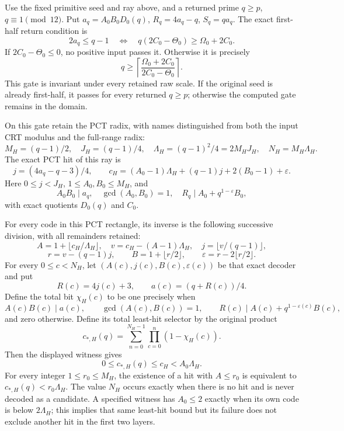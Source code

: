 \begin{theorem}
\label{thm:raw-first-half-code}
Use the fixed primitive seed and ray above, and a returned prime
\(q\ge p\), \(q\equiv1\pmod{12}\).
Put \(a_q=A_0B_0D_0(q)\), \(R_q=4a_q-q\), \(S_q=qa_q\).
The exact first-half return condition is
\begin{equation}\label{eq:raw-first-half-gate}
 2a_q\le q-1
 \quad\Longleftrightarrow\quad
 q(2C_0-\Theta_0)\ge\Omega_0+2C_0.
\end{equation}
If \(2C_0-\Theta_0\le0\), no positive input passes it.
Otherwise it is precisely
\[
 q\ge\left\lceil\frac{\Omega_0+2C_0}{2C_0-\Theta_0}\right\rceil.
\]
This gate is invariant under every retained raw scale.  If the
original seed is already first-half, it passes for every returned
\(q\ge p\); otherwise the computed gate remains in the domain.

On this gate retain the PCT radix, with names distinguished from
both the input CRT modulus and the full-range radix:
\[
 M_H=(q-1)/2,\quad J_H=(q-1)/4,\quad
 \Lambda_H=(q-1)^2/4=2M_HJ_H,\quad N_H=M_H\Lambda_H.
\]
The exact PCT hit of this ray is
\begin{equation}\label{eq:raw-pct-code}
 j=(4a_q-q-3)/4,\qquad
 c_H=(A_0-1)\Lambda_H+(q-1)j+2(B_0-1)+\varepsilon.
\end{equation}
Here \(0\le j<J_H\), \(1\le A_0,B_0\le M_H\), and
\[
 A_0B_0\mid a_q,\quad \gcd(A_0,B_0)=1,\quad
 R_q\mid A_0+q^{1-\varepsilon}B_0,
\]
with exact quotients \(D_0(q)\) and \(C_0\).

For every code in this PCT rectangle, its inverse is the following
successive division, with all remainders retained:
\[
 A=1+\lfloor c_H/\Lambda_H\rfloor,\quad
 v=c_H-(A-1)\Lambda_H,\quad j=\lfloor v/(q-1)\rfloor,
\]
\[
 r=v-(q-1)j,\qquad B=1+\lfloor r/2\rfloor,
 \qquad\varepsilon=r-2\lfloor r/2\rfloor.
\]
For every \(0\le c<N_H\), let
\((A(c),j(c),B(c),\varepsilon(c))\) be that exact decoder and put
\[
 R(c)=4j(c)+3,\qquad a(c)=(q+R(c))/4.
\]
Define the total bit \(\chi_H(c)\) to be one precisely when
\[
 A(c)B(c)\mid a(c),\qquad \gcd(A(c),B(c))=1,\qquad
 R(c)\mid A(c)+q^{1-\varepsilon(c)}B(c),
\]
and zero otherwise. Define its total least-hit selector by the original product
\[
 c_{*,H}(q)=\sum_{n=0}^{N_H-1}\prod_{c=0}^n(1-\chi_H(c)).
\]
Then the displayed witness gives
\[
 0\le c_{*,H}(q)\le c_H<A_0\Lambda_H.
\]
For every integer \(1\le r_0\le M_H\), the existence of a hit
with \(A\le r_0\) is equivalent to
\(c_{*,H}(q)<r_0\Lambda_H\).
The value \(N_H\) occurs exactly when there is no hit and is
never decoded as a candidate.  A specified witness has
\(A_0\le2\) exactly when its own code is below
\(2\Lambda_H\); this implies that same least-hit bound but its
failure does not exclude another hit in the first two layers.


\end{theorem}
